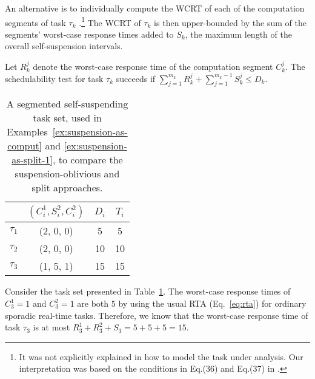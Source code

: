 
\label{sec:model-interferred:split}

An alternative is to individually compute the WCRT of each of the computation segments of task $\tau_k$ \cite{bletsas:thesis,PH:rtss98,Huang:multiseg}.\footnote{\label{footnote-rtss98}It was not explicitly explained in \cite{PH:rtss98} how to model the task under analysis. Our interpretation was based on the conditions in Eq.(36) and Eq.(37) in \cite{PH:rtss98}.}
The WCRT of $\tau_k$ is then upper-bounded by the sum of the segments' worst-case response times added to $S_k$, the maximum length of the overall
self-suspension intervals. 
 
Let $R_k^j$ denote the worst-case response time of the computation segment $C_k^j$. The schedulability test for task $\tau_k$ succeeds if $\sum_{j=1}^{m_k} R_k^j + \sum_{j=1}^{m_k-1} S_k^j \leq D_k $. 

\begin{table}[t]
\centering
    \begin{tabular}{|c|c|c|c|}
 \hline
        & $(C_i^1, S_i^2, C_i^2)$ &  $D_i$ & $T_i$\\ 
        \hline
        $\tau_1$ & (2, 0, 0) &  5 & 5\\ 
        $\tau_2$ &  (2, 0, 0) & 10 & 10 \\ 
        $\tau_3$ & (1, 5, 1) & 15  & 15\\
        \hline
    \end{tabular} 
    \caption{A segmented self-suspending task set, used in Examples~\ref{ex:suspension-as-comput} and \ref{ex:suspension-as-split-1}, to compare the suspension-oblivious and split approaches.}
    \label{table:static-example}
\end{table}

\begin{example}
\label{ex:suspension-as-split-1}   
Consider the task set presented in Table~\ref{table:static-example}. The worst-case response times of $C_3^1=1$ and $C_3^2=1$ are both $5$ by using the usual RTA (Eq.~\eqref{eq:rta}) for ordinary sporadic real-time tasks. Therefore, we know that the worst-case response time of task $\tau_3$ is at most $R_3^1 + R_3^2 + S_3 = 5 + 5 + 5 = 15$.
\hfill\myendproof  
\end{example}

